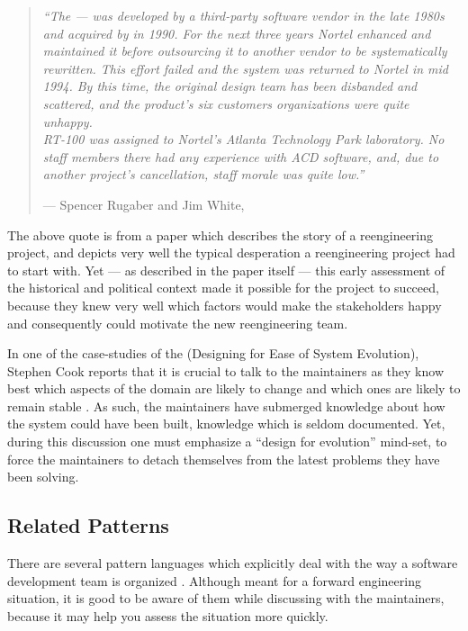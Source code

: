 \documentclass[a4paper,10pt,twoside]{book}
\begin{document}
\begin{quotation}
\noindent
\emph{``The  --- was developed by a third-party software vendor in the late 1980s and acquired by  in 1990. For the next three years Nortel enhanced and maintained it before outsourcing it to another vendor to be systematically rewritten. This effort failed and the system was returned to Nortel in mid 1994. By this time, the original design team has been disbanded and scattered, and the product's six customers organizations were quite unhappy.\\
RT-100 was assigned to Nortel's Atlanta Technology Park laboratory. No staff members there had any experience with ACD software, and, due to another project's cancellation, staff morale was quite low.''}

\hfill --- Spencer Rugaber and Jim White, \cite{Ruga98a}
\end{quotation}

The above quote is from a paper which describes the story of a reengineering project, and depicts very well the typical desperation a reengineering project had to start with. Yet --- as described in the paper itself --- this early assessment of the historical and political context made it possible for the project to succeed, because they knew very well which factors would make the stakeholders happy and consequently could motivate the new reengineering team.

In one of the case-studies of the  (Designing for Ease of System Evolution), Stephen Cook reports that it is crucial to talk to the maintainers as they know best which aspects of the domain are likely to change and which ones are likely to remain stable \cite{Cook01a}. As such, the maintainers have submerged knowledge about how the system could have been built, knowledge which is seldom documented. Yet, during this discussion one must emphasize a ``design for evolution'' mind-set, to force the maintainers to detach themselves from the latest problems they have been solving.

\subsection*{Related Patterns}

There are several pattern languages which explicitly deal with the way a software development team is organized \cite{Copl95d} \cite{Harri96a} \cite{Tayl00a} \cite{Beed00a}. Although meant for a forward engineering situation, it is good to be aware of them while discussing with the maintainers, because it may help you assess the situation more quickly.
\end{document}
